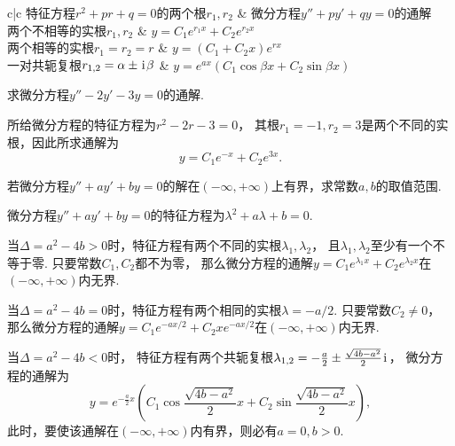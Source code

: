 \begin{table}[htb]
	\centering
	\begin{tblr}{c|c}
		\hline
		特征方程\(r^2+pr+q=0\)的两个根\(r_1,r_2\)
			& 微分方程\(y''+py'+qy = 0\)的通解 \\ \hline
		两个不相等的实根\(r_1,r_2\)
			& \(y = C_1 e^{r_1 x} + C_2 e^{r_2 x}\) \\
		两个相等的实根\(r_1=r_2=r\)
			& \(y = (C_1 + C_2 x) e^{r x}\) \\
		一对共轭复根\(r_{1,2}=\alpha\pm\kern1pt\mathrm{i}\kern1pt\beta\)
			& \(y = e^{ax} (C_1 \cos{\beta x} + C_2 \sin{\beta x})\) \\ \hline
	\end{tblr}
	\caption{}
	\label{table:二阶常系数齐次线性微分方程.通解}
\end{table}

\begin{example}
求微分方程\(y'' - 2y' - 3y = 0\)的通解.
\begin{solution}
所给微分方程的特征方程为\(r^2-2r-3=0\)，
其根\(r_1=-1, r_2=3\)是两个不同的实根，因此所求通解为\[
	y = C_1 e^{-x} + C_2 e^{3x}.
\]
\end{solution}
\end{example}

\begin{example}
若微分方程\(y''+ay'+by=0\)的解在\((-\infty,+\infty)\)上有界，求常数\(a,b\)的取值范围.
\begin{solution}
微分方程\(y''+ay'+by=0\)的特征方程为\(\lambda^2 + a\lambda+b = 0\).

当\(\Delta=a^2-4b>0\)时，特征方程有两个不同的实根\(\lambda_1,\lambda_2\)，
且\(\lambda_1,\lambda_2\)至少有一个不等于零.
只要常数\(C_1,C_2\)都不为零，
那么微分方程的通解\(y = C_1 e^{\lambda_1 x} + C_2 e^{\lambda_2 x}\)在\((-\infty,+\infty)\)内无界.

当\(\Delta=a^2-4b=0\)时，特征方程有两个相同的实根\(\lambda=-a/2\).
只要常数\(C_2\neq0\)，
那么微分方程的通解\(y = C_1 e^{-ax/2} + C_2 x e^{-ax/2}\)在\((-\infty,+\infty)\)内无界.

当\(\Delta=a^2-4b<0\)时，
特征方程有两个共轭复根\(\lambda_{1,2}=-\frac{a}{2}\pm\frac{\sqrt{4b-a^2}}{2}\kern1pt\mathrm{i}\kern1pt\)，
微分方程的通解为\[
	y = e^{-\frac{a}{2}x} \left( C_1 \cos\frac{\sqrt{4b-a^2}}{2}x + C_2 \sin\frac{\sqrt{4b-a^2}}{2}x \right),
\]
此时，要使该通解在\((-\infty,+\infty)\)内有界，则必有\(a = 0, b > 0\).
\end{solution}
\end{example}

